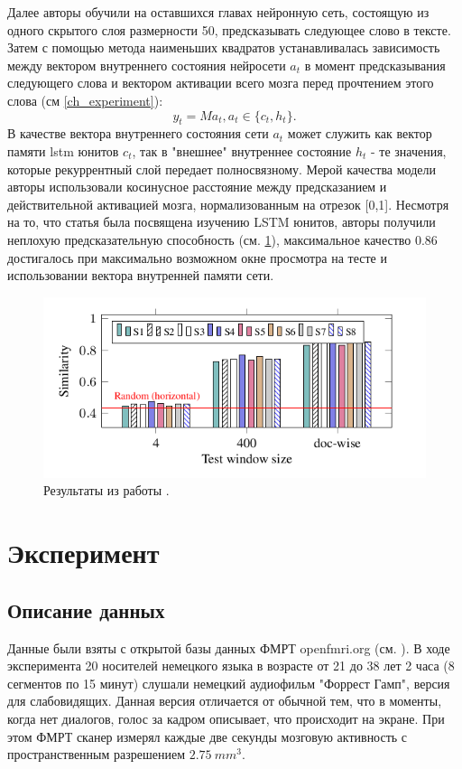 \documentclass[pdftex,ptm,12pt,a4paper]{report}
\theoremstyle{definition}
\begin{document}
Далее авторы обучили на оставшихся главах нейронную сеть, состоящую из одного скрытого слоя  размерности 50, предсказывать следующее слово в тексте. Затем с помощью метода наименьших квадратов устанавливалась зависимость между вектором внутреннего состояния нейросети $a_t$ в момент предсказывания следующего слова и вектором активации всего мозга перед прочтением этого слова (см \ref{ch_experiment}):
$$ y_t = M a_t, a_t \in \{c_t, h_t\}.$$
В качестве вектора внутреннего состояния сети $a_t$ может служить как вектор памяти lstm юнитов $c_t$, так в "внешнее" внутреннее состояние $h_t$ - те значения, которые рекуррентный слой передает полносвязному.
Мерой качества модели авторы использовали косинусное расстояние между предсказанием и действительной активацией мозга, нормализованным на отрезок [0,1]. Несмотря на то, что статья была посвящена изучению LSTM юнитов, авторы получили неплохую предсказательную способность (см. \ref{qian_res}), максимальное качество 0.86 достигалось при максимально возможном окне просмотра на тесте и использовании вектора внутренней памяти сети.

\begin{figure}[h]
\includegraphics[scale=0.7]{images/neural_nets.png}
\centering
\caption{Результаты из работы \cite{qian2016bridging}.}
\label{qian_res}
\end{figure}

\chapter{Эксперимент}

\section{Описание данных}

Данные были взяты с открытой базы данных ФМРТ openfmri.org (см. \citep{hanke2014high}). В ходе эксперимента 20 носителей немецкого языка в возрасте от 21 до 38 лет 2 часа (8 сегментов по 15 минут) слушали немецкий аудиофильм "Форрест Гамп", версия для слабовидящих. Данная версия отличается от обычной тем, что в моменты, когда нет диалогов, голос за кадром описывает, что происходит на экране. При этом ФМРТ сканер измерял каждые две секунды мозговую активность с пространственным разрешением $2.75\ mm^3$.
\end{document}
